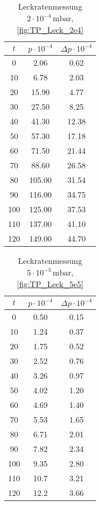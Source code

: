 \begin{table}[H]
    \centering
    \caption{Leckratenmessung $2 \cdot 10^{-4} \, \si{\milli\bar}$, \ref{fig:TP_Leck_2e4}}
    \label{tab:TP_Leck_2e4}
    \begin{tabular}{c c c}
        \toprule
        {$t$} & {$p \cdot 10^{-4}$} & {$\Delta p \cdot 10^{-4}$} \\
        \midrule
        0 &   2.06 & 0.62\\
        10 &  6.78 & 2.03\\
        20 &  15.90 & 4.77\\
        30 &  27.50 & 8.25\\
        40 &  41.30 & 12.38\\
        50 &  57.30 & 17.18\\
        60 &  71.50 & 21.44\\
        70 &  88.60 & 26.58\\
        80 &  105.00 & 31.54\\
        90 &  116.00 & 34.75\\
        100 & 125.00 & 37.53\\
        110 & 137.00 & 41.10\\
        120 & 149.00 & 44.70\\
        \bottomrule
    \end{tabular}
\end{table}

\begin{table}[H]
    \centering
    \caption{Leckratenmessung $5 \cdot 10^{-5} \, \si{\milli\bar}$, \ref{fig:TP_Leck_5e5}}
    \label{tab:TP_Leck_5e5}
    \begin{tabular}{c c c}
        \toprule
        {$t$} & {$p \cdot 10^{-4}$} & {$\Delta p \cdot 10^{-4}$} \\
        \midrule
        0 &   0.50 & 0.15\\
        10 &  1.24 & 0.37\\
        20 &  1.75 & 0.52\\
        30 &  2.52 & 0.76\\
        40 &  3.26 & 0.97\\
        50 &  4.02 & 1.20\\
        60 &  4.69 & 1.40\\
        70 &  5.53 & 1.65\\
        80 &  6.71 & 2.01\\
        90 &  7.82 & 2.34\\
        100 & 9.35 & 2.80\\
        110 & 10.7 & 3.21\\
        120 & 12.2 & 3.66\\
        \bottomrule
    \end{tabular}
\end{table}

